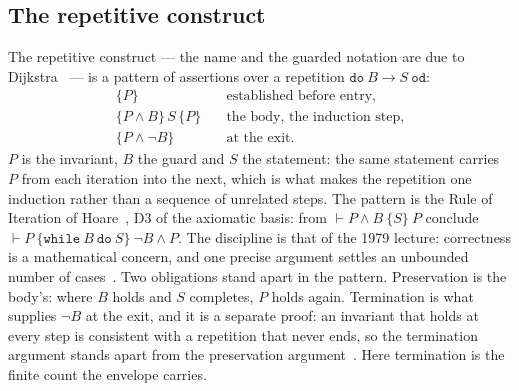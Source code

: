 \documentclass[10pt,journal,letterpaper]{IEEEtran}
\newcommand{\code}[1]{\texttt{#1}}
\begin{document}
\subsection{The repetitive construct}
The repetitive construct --- the name and the guarded notation are due to Dijkstra~\cite{ewd720,ewd1215} --- is a pattern of assertions over a repetition $\code{do}\ B \to S\ \code{od}$:
\begin{align}
\{P\} &\quad \text{established before entry,}\label{eq:loop-entry}\\
\{P \wedge B\}\, S\, \{P\} &\quad \text{the body, the induction step,}\label{eq:loop-body}\\
\{P \wedge \neg B\} &\quad \text{at the exit.}\label{eq:loop-exit}
\end{align}
$P$ is the invariant, $B$ the guard and $S$ the statement: the same statement carries $P$ from each iteration into the next, which is what makes the repetition one induction rather than a sequence of unrelated steps. The pattern is the Rule of Iteration of Hoare~\cite{hoare1969}, D3 of the axiomatic basis: from $\vdash P \wedge B\ \{S\}\ P$ conclude $\vdash P\ \{\code{while}\ B\ \code{do}\ S\}\ \neg B \wedge P$. The discipline is that of the 1979 lecture: correctness is a mathematical concern, and one precise argument settles an unbounded number of cases~\cite{ewd720}. Two obligations stand apart in the pattern. Preservation is the body's: where $B$ holds and $S$ completes, $P$ holds again. Termination is what supplies $\neg B$ at the exit, and it is a separate proof: an invariant that holds at every step is consistent with a repetition that never ends, so the termination argument stands apart from the preservation argument~\cite{ewd1215}. Here termination is the finite count the envelope carries.
\end{document}

